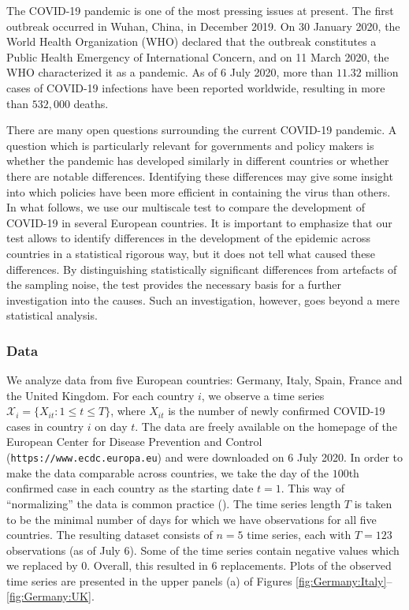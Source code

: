 \documentclass[a4paper,12pt]{article}
\numberwithin{equation}{section}
\begin{document}
The COVID-19 pandemic is one of the most pressing issues at present. The first outbreak occurred in Wuhan, China, in December 2019. On 30 January 2020, the World Health Organization (WHO) declared that the outbreak constitutes a Public Health Emergency of International Concern, and on 11 March 2020, the WHO characterized it as a pandemic. As of 6 July 2020, more than $11.32$ million cases of COVID-19 infections have been reported worldwide, resulting in more than $532,000$ deaths.

There are many open questions surrounding the current COVID-19 pandemic. A question which is particularly relevant for governments and policy makers is whether the pandemic has developed similarly in different countries or whether there are notable differences. Identifying these differences may give some insight into which policies have been more efficient in containing the virus than others. In what follows, we use our multiscale test to compare the development of COVID-19 in several European countries. It is important to emphasize that our test allows to identify differences in the development of the epidemic across countries in a statistical rigorous way, but it does not tell what caused these differences. By distinguishing statistically significant differences from artefacts of the sampling noise, the test provides the necessary basis for a further investigation into the causes. Such an investigation, however, goes beyond a mere statistical analysis. 


\subsubsection{Data}


We analyze data from five European countries: Germany, Italy, Spain, France and the United Kingdom. For each country $i$, we observe a time series $\mathcal{X}_i = \{ X_{it}: 1 \le t \le T \}$, where $X_{it}$ is the number of newly confirmed COVID-19 cases in country $i$ on day $t$. The data are freely available on the homepage of the European Center for Disease Prevention and Control (\texttt{https://www.ecdc.europa.eu}) and were downloaded on 6 July 2020. In order to make the data comparable across countries, we take the day of the $100$th confirmed case in each country as the starting date $t=1$. This way of ``normalizing'' the data is common practice (\cite{Cohen2020}). The time series length $T$ is taken to be the minimal number of days for which we have observations for all five countries. The resulting dataset consists of $n = 5$ time series, each with $T = 123$ observations (as of July 6). Some of the time series contain negative values which we replaced by $0$. Overall, this resulted in $6$ replacements. Plots of the observed time series are presented in the upper panels (a) of Figures \ref{fig:Germany:Italy}--\ref{fig:Germany:UK}.
\end{document}
